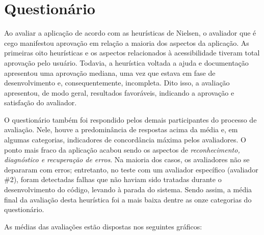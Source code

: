 \section{Questionário}

Ao avaliar a aplicação de acordo com as heurísticas de Nielsen, o avaliador que é cego manifestou aprovação em relação a maioria dos aspectos da aplicação.  As primeiras oito heurísticas e os aspectos relacionados à acessibilidade tiveram total aprovação pelo usuário. Todavia, a heurística voltada a ajuda e documentação apresentou uma aprovação mediana, uma vez que estava em fase de desenvolvimento e, consequentemente, incompleta. Dito isso, a avaliação apresentou, de modo geral, resultados favoráveis, indicando a aprovação e satisfação do avaliador.

O questionário também foi respondido pelos demais participantes do processo de avaliação. Nele, houve a predominância de respostas acima da média e, em algumas categorias, indicadores de concordância máxima pelos avaliadores. O ponto mais fraco da aplicação acabou sendo os aspectos de \emph{reconhecimento, diagnóstico e recuperação de erros}. Na maioria dos casos, os avaliadores não se depararam com erros; entretanto, no teste com um avaliador específico (avaliador \#2), foram detectadas falhas que não haviam sido tratadas durante o desenvolvimento do código, levando à parada do sistema. Sendo assim, a média final da avaliação desta heurística foi a mais baixa dentre as onze categorias do questionário.

As médias das avaliações estão dispostas nos seguintes gráficos:

